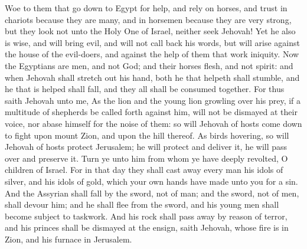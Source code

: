Woe to them that go down to Egypt for help, and rely on horses, and trust in chariots because they are many, and in horsemen because they are very strong, but they look not unto the Holy One of Israel, neither seek Jehovah! Yet he also is wise, and will bring evil, and will not call back his words, but will arise against the house of the evil-doers, and against the help of them that work iniquity. Now the Egyptians are men, and not God; and their horses flesh, and not spirit: and when Jehovah shall stretch out his hand, both he that helpeth shall stumble, and he that is helped shall fall, and they all shall be consumed together.  For thus saith Jehovah unto me, As the lion and the young lion growling over his prey, if a multitude of shepherds be called forth against him, will not be dismayed at their voice, nor abase himself for the noise of them: so will Jehovah of hosts come down to fight upon mount Zion, and upon the hill thereof. As birds hovering, so will Jehovah of hosts protect Jerusalem; he will protect and deliver it, he will pass over and preserve it. Turn ye unto him from whom ye have deeply revolted, O children of Israel. For in that day they shall cast away every man his idols of silver, and his idols of gold, which your own hands have made unto you for a sin. And the Assyrian shall fall by the sword, not of man; and the sword, not of men, shall devour him; and he shall flee from the sword, and his young men shall become subject to taskwork. And his rock shall pass away by reason of terror, and his princes shall be dismayed at the ensign, saith Jehovah, whose fire is in Zion, and his furnace in Jerusalem. 

